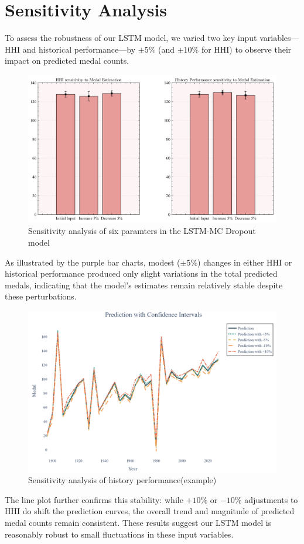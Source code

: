 \documentclass{mcmthesis}
\begin{document}
\section{Sensitivity Analysis}
To assess the robustness of our LSTM model, we varied two key input variables—HHI and historical performance—by $\pm5\%$ (and $\pm10\%$ for HHI) to observe their impact on predicted medal counts. 

	\begin{figure}[H]
	\centering
	\includegraphics[width=0.8\linewidth]{fig/barplot.png}
	\caption{Sensitivity analysis of six paramters in the LSTM-MC Dropout model}
	\label{barplot}
	\end{figure}
As illustrated by the purple bar charts, modest ($\pm5\%$) changes in either HHI or historical performance produced only slight variations in the total predicted medals, indicating that the model’s estimates remain relatively stable despite these perturbations. 

	\begin{figure}[H]
	\centering
	\includegraphics[width=0.8\linewidth]{fig/lineplot.png}
	\caption{Sensitivity analysis of history performance(example)}
	\label{lineplot}
\end{figure}
The line plot further confirms this stability: while $+10\%$ or $-10\%$ adjustments to HHI do shift the prediction curves, the overall trend and magnitude of predicted medal counts remain consistent. These results suggest our LSTM model is reasonably robust to small fluctuations in these input variables.
	
\end{document}
